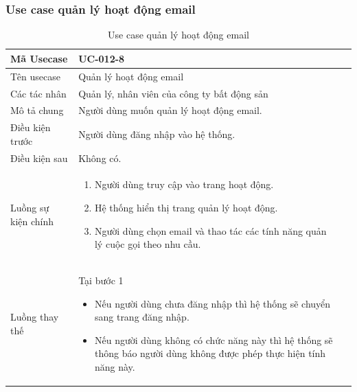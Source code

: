 \documentclass[12pt,a4paper]{article}
\begin{document}
    \subsubsection*{Use case quản lý hoạt động email}
    \begin{table}[H]
        \centering
        \begin{tabular}{|p{3.5cm}|p{11.5cm}|c|}
            \hline
            Mã Usecase      & UC-012-8                                    \\
            \hline
            Tên usecase     & Quản lý hoạt động email                     \\
            \hline
            Các tác nhân    & Quản lý, nhân viên của công ty bất động sản \\
            \hline
            Mô tả chung     & Người dùng muốn quản lý hoạt động email.    \\
            \hline

            Điều kiện trước & Người dùng đăng nhập vào hệ thống.          \\
            \hline

            Điều kiện sau   & Không có.                                   \\
            \hline

            Luồng sự kiện chính & \vspace{-.8cm}\begin{enumerate}
                                                    \item Người dùng truy cập vào trang hoạt động.
                                                    \item Hệ thống hiển thị trang quản lý hoạt động.
                                                    \item Người dùng chọn email và thao tác các tính năng quản lý cuộc gọi theo nhu cầu.
            \end{enumerate}
            \\
            \hline
            Luồng thay thế & Tại bước 1\newline
            \vspace{-.8cm}\begin{itemize}
                              \item Nếu người dùng chưa đăng nhập thì hệ thống sẽ chuyển sang trang đăng nhập.
                              \item Nếu người dùng không có chức năng này thì hệ thống sẽ thông báo người dùng không được phép thực hiện tính năng này.
            \end{itemize}

            \\ \hline
        \end{tabular}
        \caption{Use case quản lý hoạt động email}

    \end{table}
\end{document}
